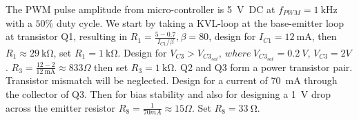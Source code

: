 The PWM pulse amplitude from micro-controller is \SI{5}{\volt DC} at $f_{PWM}=\SI{1}{\kilo \hertz}$ with a $50 \%$ duty cycle. We start by taking a KVL-loop at the base-emitter loop at transistor Q1, resulting in $R_1=\frac{5-0.7}{I_{C1}/\beta}, \beta=80$, design for $I_{C1}=\SI{12}{\milli \ampere}$, then $R_1\approx \SI{29}{\kilo \ohm}$, set $R_1 = \SI{1}{\kilo \ohm}$.
Design for $V_{C3}>V_{C3_{sat}},  \ where \  V_{C3_{sat}}=0.2 \ V$, $V_{C3}=2V$. $R_3=\frac{12-2}{\SI{12}{\milli \ampere}}\approx 833 \Omega$ then set $R_3 = \SI{1}{\kilo \ohm}$.
Q2 and Q3 form a power transistor pair. Transistor mismatch will be neglected. Design for a current of \SI{70}{\milli \ampere} through the collector of Q3. Then for bias stability and also for designing a \SI{1}{\volt} drop across the emitter resistor $R_8=\frac{1}{70 mA}\approx 15\Omega$. Set $R_8 = \SI{33}{\ohm}$.
